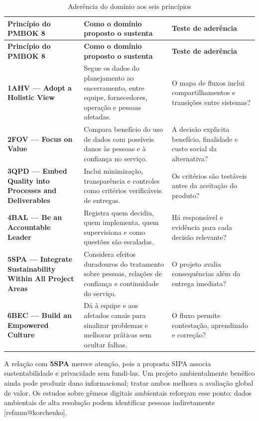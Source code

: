 \documentclass[12pt,a4paper,article,oneside,english,brazil]{abntex2}
\makeatletter
\newcommand{\fontetab}[1]{\par\vspace{3pt}{\small\noindent Fonte: #1\par}}
\newcommand{\refnum}[1]{\csname refnum@#1\endcsname}
\newcommand{\cit}[1]{[\refnum{#1}]}
\makeatother
\begin{document}
\begingroup\SingleSpacing\small
\begin{longtable}{@{}>{\raggedright\arraybackslash}p{}>{\raggedright\arraybackslash}p{}>{\raggedright\arraybackslash}p{}@{}}
\caption{Aderência do domínio aos seis princípios}\label{tab:t9}\\
\hline
\textbf{Princípio do PMBOK 8} & \textbf{Como o domínio proposto o sustenta} & \textbf{Teste de aderência}\\
\hline
\endfirsthead
\hline
\textbf{Princípio do PMBOK 8} & \textbf{Como o domínio proposto o sustenta} & \textbf{Teste de aderência}\\
\hline
\endhead
\hline
\endfoot
\hline
\endlastfoot
\textbf{1AHV — Adopt a Holistic View} & Segue os dados do planejamento ao encerramento, entre equipe, fornecedores, operação e pessoas afetadas. & O mapa de fluxos inclui compartilhamentos e transições entre sistemas?\\[3pt]
\textbf{2FOV — Focus on Value} & Compara benefício do uso de dados com possíveis danos às pessoas e à confiança no serviço. & A decisão explicita benefício, finalidade e custo social da alternativa?\\[3pt]
\textbf{3QPD — Embed Quality into Processes and Deliverables} & Inclui minimização, transparência e controles como critérios verificáveis de entregas. & Os critérios são testáveis antes da aceitação do produto?\\[3pt]
\textbf{4BAL — Be an Accountable Leader} & Registra quem decidiu, quem implementa, quem supervisiona e como questões são escaladas. & Há responsável e evidência para cada decisão relevante?\\[3pt]
\textbf{5SPA — Integrate Sustainability Within All Project Areas} & Considera efeitos duradouros do tratamento sobre pessoas, relações de confiança e continuidade do serviço. & O projeto avalia consequências além da entrega imediata?\\[3pt]
\textbf{6BEC — Build an Empowered Culture} & Dá à equipe e aos afetados canais para sinalizar problemas e melhorar práticas sem ocultar falhas. & O fluxo permite contestação, aprendizado e correção?\\[3pt]
\end{longtable}
\endgroup
\fontetab{Elaborado pelos autores (2026), com base em \cit{pmi}.}

A relação com \textbf{5SPA} merece atenção, pois a proposta SIPA associa sustentabilidade e privacidade sem fundi-las. Um projeto ambientalmente benéfico ainda pode produzir dano informacional; tratar ambos melhora a avaliação global de valor. Os estudos sobre gêmeos digitais ambientais reforçam esse ponto: dados ambientais de alta resolução podem identificar pessoas indiretamente [\refnum{korchenko}].
\end{document}
